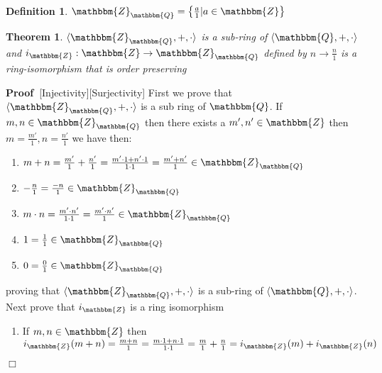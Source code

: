 \documentclass{book}
\newcommand{\nobracket}{}
\newcommand{\upl}{+}
\newenvironment{proof}{\noindent\textbf{Proof\ }}{\hspace*{\fill}$\Box$\medskip}
\newtheorem{definition}{Definition}
{\theorembodyfont{\rmfamily}\newtheorem{example}{Example}}
\newtheorem{theorem}{Theorem}
\begin{document}
{{\begin{definition}
  {}$\mathbbm{Z}_{\mathbbm{Q}} = \left\{
  \frac{a}{1} | a \in \mathbbm{Z} \nobracket \right\}$
\end{definition}

\begin{theorem}
  \label{embedding of the whole numbers in the rationals}$\langle
  \mathbbm{Z}_{\mathbbm{Q}}, +, \cdot \rangle$ is a sub-ring of $\langle
  \mathbbm{Q}, +, \cdot \rangle$ and $i_{\mathbbm{Z}} : \mathbbm{Z}
  \rightarrow \mathbbm{Z}_{\mathbbm{Q}}$ defined by $n \rightarrow
  \frac{n}{1}$ is a ring-isomorphism that is order preserving
\end{theorem}

\begin{proof}[Injectivity][Surjectivity]
  First we prove that $\langle \mathbbm{Z}_{\mathbbm{Q}}, \upl, \cdot \rangle$
  is a sub ring of $\mathbbm{Q}$. If $m, n \in \mathbbm{Z}_{\mathbbm{Q}}$ then
  there exists a $m', n' \in \mathbbm{Z}$ then $m = \frac{m'}{1}, n =
  \frac{n'}{1}$ we have then:
  \begin{enumerate}
    \item $m \upl n = \frac{m'}{1} \upl \frac{n'}{1} = \frac{m' \cdot 1 + n'
    \cdot 1}{1 \cdot 1} = \frac{m' \upl n'}{1} \in \mathbbm{Z}_{\mathbbm{Q}}$
    
    \item $- \frac{n}{1} = \frac{- n}{1} \in \mathbbm{Z}_{\mathbbm{Q}}$
    
    \item $m \cdot n = \frac{m' \cdot n'}{1 \cdot 1} = \frac{m' \cdot n'}{1}
    \in \mathbbm{Z}_{\mathbbm{Q}}$
    
    \item $1 = \frac{1}{1} \in \mathbbm{Z}_{\mathbbm{Q}}$
    
    \item $0 = \frac{0}{1} \in \mathbbm{Z}_{\mathbbm{Q}}$
  \end{enumerate}
  proving that $\langle \mathbbm{Z}_{\mathbbm{Q}}, +, \cdot \rangle$ is a
  sub-ring of $\langle \mathbbm{Q}, +, \cdot \rangle$. Next prove that
  $i_{\mathbbm{Z}}$ is a ring isomorphism
  \begin{enumerate}
    \item If $m, n \in \mathbbm{Z}$ then $i_{\mathbbm{Z}} (m \upl n) = \frac{m
    \upl n}{1} = \frac{m \cdot 1 + n \cdot 1}{1 \cdot 1} = \frac{m}{1} \upl
    \frac{n}{1} = i_{\mathbbm{Z}} (m) + i_{\mathbbm{Z}} (n)$
    

\end{enumerate}
\end{proof}}}
\end{document}
